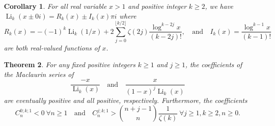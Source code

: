 \documentclass[11pt]{article}
\DeclareMathOperator{\Li}{Li}
\theoremstyle{plain}
\newtheorem{thm}{Theorem}[section]
\newtheorem{cor}[thm]{Corollary}
\theoremstyle{definition}
\begin{document}
\begin{cor}\label{cor:x>1}
For all real variable $x>1$ and positive integer $k\ge 2$, we have $\Li_k(x\pm 0i)=R_k(x)\pm I_k(x) \pi i$ where
\begin{equation*}
R_k(x)=-(-1)^k\Li_k(1/x)+2\sum_{j=0}^{\lfloor k/2 \rfloor} \zeta(2j)\frac{\log^{k-2j} x}{(k-2j)!},
\quad\text{and}\quad
I_k(x)=\frac{\log^{k-1} x}{(k-1)!}
\end{equation*}
are both real-valued functions of $x$.
\end{cor}

\begin{thm}\label{thm:TrivarDepth1}
For any fixed positive integers $k\ge 1$ and $j\ge 1$, the coefficients of the Maclaurin series of
\begin{equation*}
\frac{-x}{\Li_k(x)} \quad\text{and}\quad  \frac{x}{(1-x)^j\Li_k(x)}
\end{equation*}
are eventually positive and all positive, respectively. Furthermore, the coefficients
\begin{equation*}
C_{n}^{0;k;1}<0\ \forall n\ge 1
\quad\text{and}\quad
C_{n}^{j;k;1}>\binom{n+j-1}{n}\frac{1}{\zeta(k)}\ \forall j\ge 1, k\ge 2, n\ge 0.
\end{equation*}
\end{thm}
\end{document}
